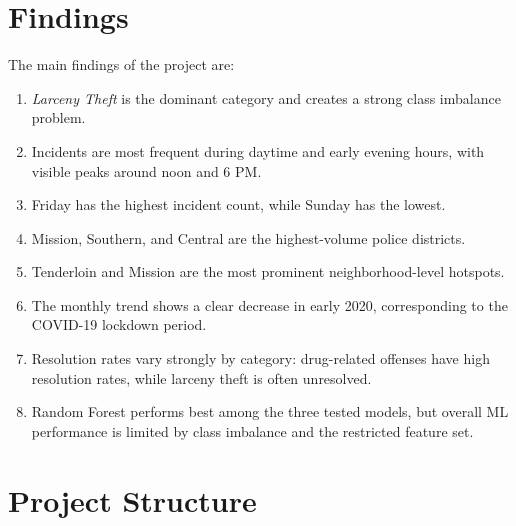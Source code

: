 \documentclass[12pt,a4paper]{article}
\begin{document}
\section{Findings}

The main findings of the project are:
\begin{enumerate}
    \item \textit{Larceny Theft} is the dominant category and creates a strong class imbalance problem.
    \item Incidents are most frequent during daytime and early evening hours, with visible peaks around noon and 6 PM.
    \item Friday has the highest incident count, while Sunday has the lowest.
    \item Mission, Southern, and Central are the highest-volume police districts.
    \item Tenderloin and Mission are the most prominent neighborhood-level hotspots.
    \item The monthly trend shows a clear decrease in early 2020, corresponding to the COVID-19 lockdown period.
    \item Resolution rates vary strongly by category: drug-related offenses have high resolution rates, while larceny theft is often unresolved.
    \item Random Forest performs best among the three tested models, but overall ML performance is limited by class imbalance and the restricted feature set.
\end{enumerate}

\section{Project Structure}
\end{document}
